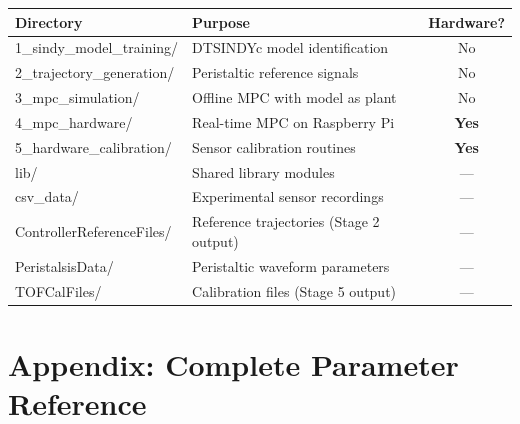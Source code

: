 \documentclass[11pt,a4paper]{article}
\begin{document}
\begin{center}
\renewcommand{\arraystretch}{1.3}
\begin{tabular}{>{\ttfamily\small}l p{7cm} c}
\toprule
\normalfont\textbf{Directory} & \textbf{Purpose} & \textbf{Hardware?} \\
\midrule
1\_sindy\_model\_training/ & DTSINDYc model identification & No \\
2\_trajectory\_generation/ & Peristaltic reference signals & No \\
3\_mpc\_simulation/ & Offline MPC with model as plant & No \\
4\_mpc\_hardware/ & Real-time MPC on Raspberry Pi & \textcolor{rosepink}{\textbf{Yes}} \\
5\_hardware\_calibration/ & Sensor calibration routines & \textcolor{rosepink}{\textbf{Yes}} \\
lib/ & Shared library modules & --- \\
csv\_data/ & Experimental sensor recordings & --- \\
ControllerReferenceFiles/ & Reference trajectories (Stage 2 output) & --- \\
PeristalsisData/ & Peristaltic waveform parameters & --- \\
TOFCalFiles/ & Calibration files (Stage 5 output) & --- \\
\bottomrule
\end{tabular}
\end{center}

\section{Appendix: Complete Parameter Reference}
\label{sec:parameters}
\end{document}
